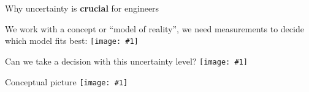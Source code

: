 \documentclass[12pt]{beamer}
\newcommand{\fig}[1]{\centering\texttt{[image: \#1]}}
\begin{document}
%
\begin{frame}{Why uncertainty is \textbf{crucial} for engineers}

\small{We work with a concept or ``model of reality'', we need measurements to decide which model fits best:}
%
\fig{two_models_experiment}
%

\end{frame}
%
\begin{frame}{Can we take a decision with this uncertainty level?}
	\fig{two_models_uncertainty}
\end{frame}
%
%
\begin{frame}{Conceptual picture }
	\fig{uncertainty_concept}
\end{frame}
%
%
\end{document}

